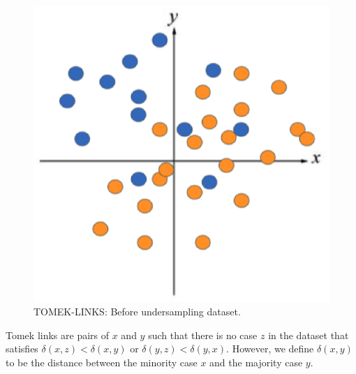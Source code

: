 \begin{center}
    \begin{figure}[ht]
        \caption{TOMEK-LINKS: Before undersampling dataset.}
        \label{tab:team-rating-features}
        \begin{center}
            \includegraphics[scale=0.6]{image/tomek1.eps}
        \end{center}
    \end{figure}
\end{center}

\clearpage

Tomek links are pairs of $x$ and $y$ such that there is no case $z$ in the dataset that satisfies $\delta(x, z) < \delta(x, y)$ or $\delta(y, z) < \delta(y, x)$.
However, we define $\delta(x, y)$ to be the distance between the minority case $x$ and the majority case $y$.


